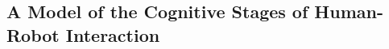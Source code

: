 \documentclass{frontiersSCNS} %
\begin{document}
%
%
%
%
%
%
% 
%
%
%
%

\subsection{A Model of the Cognitive Stages of Human-Robot Interaction}
\label{sec:cognitive-model}
\end{document}
